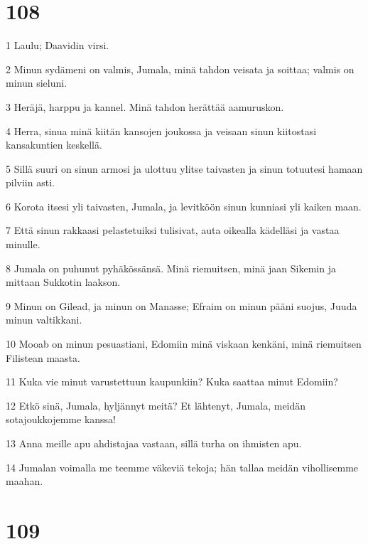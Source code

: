 \chapter{108}

\par 1 Laulu; Daavidin virsi.
\par 2 Minun sydämeni on valmis, Jumala, minä tahdon veisata ja soittaa; valmis on minun sieluni.
\par 3 Heräjä, harppu ja kannel. Minä tahdon herättää aamuruskon.
\par 4 Herra, sinua minä kiitän kansojen joukossa ja veisaan sinun kiitostasi kansakuntien keskellä.
\par 5 Sillä suuri on sinun armosi ja ulottuu ylitse taivasten ja sinun totuutesi hamaan pilviin asti.
\par 6 Korota itsesi yli taivasten, Jumala, ja levitköön sinun kunniasi yli kaiken maan.
\par 7 Että sinun rakkaasi pelastetuiksi tulisivat, auta oikealla kädelläsi ja vastaa minulle.
\par 8 Jumala on puhunut pyhäkössänsä. Minä riemuitsen, minä jaan Sikemin ja mittaan Sukkotin laakson.
\par 9 Minun on Gilead, ja minun on Manasse; Efraim on minun pääni suojus, Juuda minun valtikkani.
\par 10 Mooab on minun pesuastiani, Edomiin minä viskaan kenkäni, minä riemuitsen Filistean maasta.
\par 11 Kuka vie minut varustettuun kaupunkiin? Kuka saattaa minut Edomiin?
\par 12 Etkö sinä, Jumala, hyljännyt meitä? Et lähtenyt, Jumala, meidän sotajoukkojemme kanssa!
\par 13 Anna meille apu ahdistajaa vastaan, sillä turha on ihmisten apu.
\par 14 Jumalan voimalla me teemme väkeviä tekoja; hän tallaa meidän vihollisemme maahan.

\chapter{109}

